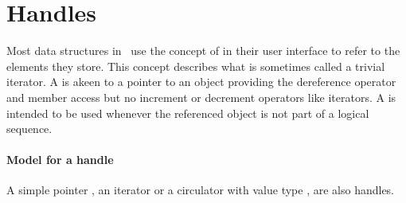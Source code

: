 

\section{Handles} 

Most data structures in \cgal\ use the concept of  in their user
interface to refer to the elements they store.  This concept describes what is
sometimes called a trivial iterator.  A  is akeen to a pointer to
an object providing the dereference operator  and member
access  but no increment or decrement operators like
iterators.  A  is intended to be used whenever the referenced
object is not part of a logical sequence.
 
\paragraph{Model for a handle}
A simple pointer , an iterator or a circulator with value type
, are also handles.
